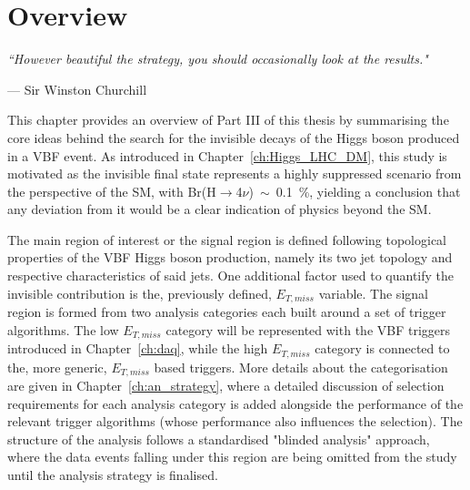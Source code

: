 
\normallinespacing
\mediumlinespacing

\chapter{Overview}
\label{ch:overview}

\epigraph{\itshape``However beautiful the strategy, you should occasionally look at the results."}{--- \textup{Sir Winston 
Churchill}}

\hspace{10pt} This chapter provides an overview of Part III of this thesis by summarising the core ideas behind the search for the invisible decays of the Higgs boson produced in a VBF event. As introduced in Chapter~\ref{ch:Higgs_LHC_DM}, this study is motivated as the invisible final state represents a highly suppressed scenario from the perspective of the SM, with Br(H$\rightarrow$4$\nu$)~$\sim$~0.1~\%, yielding a conclusion that any deviation from it would be a clear indication of physics beyond the SM.

\hspace{10pt} The main region of interest or the signal region is defined following topological properties of the VBF Higgs boson production, namely its two jet topology and respective characteristics of said jets. One additional factor used to quantify the invisible contribution is the, previously defined, $E_{T,miss}$ variable. The signal region is formed from two analysis categories each built around a set of trigger algorithms. The low $E_{T,miss}$ category will be represented with the VBF triggers introduced in Chapter~\ref{ch:daq}, while the high $E_{T,miss}$ category is connected to the, more generic, $E_{T,miss}$ based triggers. More details about the categorisation are given in Chapter~\ref{ch:an_strategy}, where a detailed discussion of selection requirements for each analysis category is added alongside the performance of the relevant trigger algorithms (whose performance also influences the selection). The structure of the analysis follows a standardised "blinded analysis" approach, where the data events falling under this region are being omitted from the study until the analysis strategy is finalised. 


